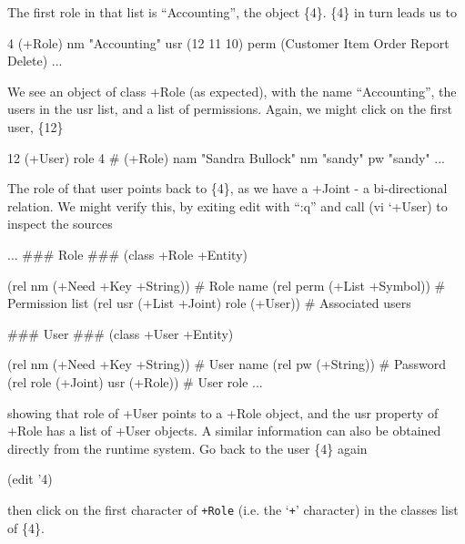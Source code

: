 The first role in that list is ``Accounting'', the object \{4\}.
 \{4\} in turn leads us to


\begin{wideverbatim}
{4} (+Role)
   nm "Accounting"
   usr ({12} {11} {10})
   perm (Customer Item Order Report Delete)
...
\end{wideverbatim}

We see an object of class +Role (as expected), with the name
``Accounting'', the users in the usr list, and a list of permissions.
 Again, we might click on the first user, \{12\}


\begin{wideverbatim}
{12} (+User)
   role {4}  # (+Role)
   nam "Sandra Bullock"
   nm "sandy"
   pw "sandy"
...
\end{wideverbatim}

The role of that user points back to \{4\}, as we have a +Joint - a
bi-directional relation. We might verify this, by exiting edit with ``:q''
and call (vi `+User) to inspect the sources


\begin{wideverbatim}
...
### Role ###
(class +Role +Entity)

(rel nm (+Need +Key +String))          # Role name
(rel perm (+List +Symbol))             # Permission list
(rel usr (+List +Joint) role (+User))  # Associated users


### User ###
(class +User +Entity)

(rel nm (+Need +Key +String))          # User name
(rel pw (+String))                     # Password
(rel role (+Joint) usr (+Role))        # User role
...
\end{wideverbatim}

showing that role of +User points to a +Role object, and the usr
property of +Role has a list of +User objects.
 A similar information can also be obtained directly from the runtime
system. Go back to the user \{4\} again


\begin{wideverbatim}
(edit '{4})
\end{wideverbatim}

then click on the first character of \texttt{+Role} (i.e. the
`\texttt{+}' character) in the classes list of \{4\}.



